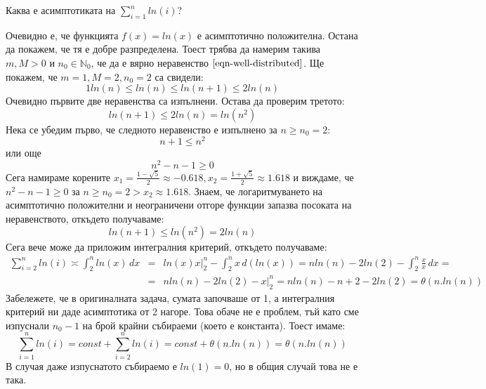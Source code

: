 \begin{application}
	Каква е асимптотиката на $\sum\limits_{i=1}^nln(i)$?
\end{application}
\begin{solution}
	Очевидно е, че функцията $f(x)=ln(x)$ е асимптотично положителна. Остана да покажем, че тя е добре разпределена. Тоест трябва да намерим такива $m,M>0$ и $n_0\in\mathbb{N}_0$, че да е вярно неравенство $\ref{eqn-well-distributed}$. Ще покажем, че $m=1,M=2,n_0=2$ са свидели:
	\begin{equation*}
		1ln(n)\le ln(n)\le ln(n+1)\le 2ln(n)
	\end{equation*}
	Очевидно първите две неравенства са изпълнени. Остава да проверим третото:
	\begin{equation*}
		ln(n+1)\le 2ln(n)=ln(n^2)
	\end{equation*}
	Нека се убедим първо, че следното неравенство е изпълнено за $n\ge n_0=2$:
	\begin{equation*}
		n+1\le n^2
	\end{equation*}
	или още
	\begin{equation*}
		n^2-n-1\ge0
	\end{equation*}
	Сега намираме корените $x_1=\frac{1-\sqrt5}{2}\approx-0.618,x_2=\frac{1+\sqrt5}{2}\approx1.618$ и виждаме, че $n^2-n-1\ge0$ за $n\ge n_0=2>x_2\approx1.618$.
	Знаем, че логаритмуването на асимптотично положителни и неограничени отгоре функции запазва посоката на неравенството, откъдето получаваме:
	\begin{equation*}
		ln(n+1)\le ln(n^2)=2ln(n)
	\end{equation*}
	Сега вече може да приложим интегралния критерий, откъдето получаваме:
	\begin{eqnarray*}
		\displaystyle\sum_{i=2}^nln(i)\asymp\displaystyle\int_2^nln(x)\,dx & = & ln(x)x\Big|^n_2-\displaystyle\int_2^nx\,d(ln(x))=nln(n)-2ln(2)-\displaystyle\int_2^n\frac xx\,dx= \\
		& = & nln(n)-2ln(2)-x\Big|^n_2=nln(n)-n+2-2ln(2)=\theta(n.ln(n))
	\end{eqnarray*}
	Забележете, че в оригиналната задача, сумата започваше от 1, а интегралния критерий ни даде асимптотика от 2 нагоре. Това обаче не е проблем, тъй като сме изпуснали $n_0-1$ на брой крайни събираеми (което е константа). Тоест имаме:
	\begin{equation*}
		\displaystyle\sum_{i=1}^nln(i)=const+\displaystyle\sum_{i=2}^nln(i)=const+\theta(n.ln(n))=\theta(n.ln(n))
	\end{equation*}
	В случая даже изпуснатото събираемо е $ln(1)=0$, но в общия случай това не е така.
\end{solution}\leavevmode\newline

